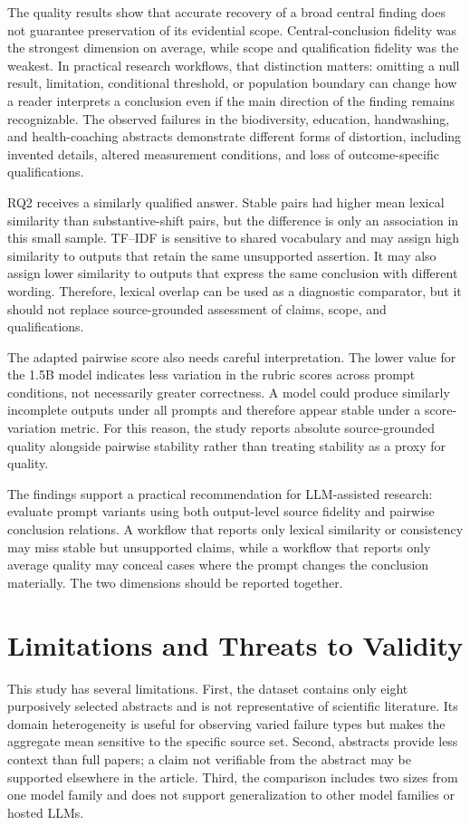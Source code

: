 \documentclass[acmsmall,screen,nonacm]{acmart}
\begin{document}
The quality results show that accurate recovery of a broad central finding does not guarantee preservation of its evidential scope. Central-conclusion fidelity was the strongest dimension on average, while scope and qualification fidelity was the weakest. In practical research workflows, that distinction matters: omitting a null result, limitation, conditional threshold, or population boundary can change how a reader interprets a conclusion even if the main direction of the finding remains recognizable. The observed failures in the biodiversity, education, handwashing, and health-coaching abstracts demonstrate different forms of distortion, including invented details, altered measurement conditions, and loss of outcome-specific qualifications.

RQ2 receives a similarly qualified answer. Stable pairs had higher mean lexical similarity than substantive-shift pairs, but the difference is only an association in this small sample. TF--IDF is sensitive to shared vocabulary and may assign high similarity to outputs that retain the same unsupported assertion. It may also assign lower similarity to outputs that express the same conclusion with different wording. Therefore, lexical overlap can be used as a diagnostic comparator, but it should not replace source-grounded assessment of claims, scope, and qualifications.

The adapted pairwise score also needs careful interpretation. The lower value for the 1.5B model indicates less variation in the rubric scores across prompt conditions, not necessarily greater correctness. A model could produce similarly incomplete outputs under all prompts and therefore appear stable under a score-variation metric. For this reason, the study reports absolute source-grounded quality alongside pairwise stability rather than treating stability as a proxy for quality.

The findings support a practical recommendation for LLM-assisted research: evaluate prompt variants using both output-level source fidelity and pairwise conclusion relations. A workflow that reports only lexical similarity or consistency may miss stable but unsupported claims, while a workflow that reports only average quality may conceal cases where the prompt changes the conclusion materially. The two dimensions should be reported together.

\section{Limitations and Threats to Validity}
This study has several limitations. First, the dataset contains only eight purposively selected abstracts and is not representative of scientific literature. Its domain heterogeneity is useful for observing varied failure types but makes the aggregate mean sensitive to the specific source set. Second, abstracts provide less context than full papers; a claim not verifiable from the abstract may be supported elsewhere in the article. Third, the comparison includes two sizes from one model family and does not support generalization to other model families or hosted LLMs.
\end{document}
